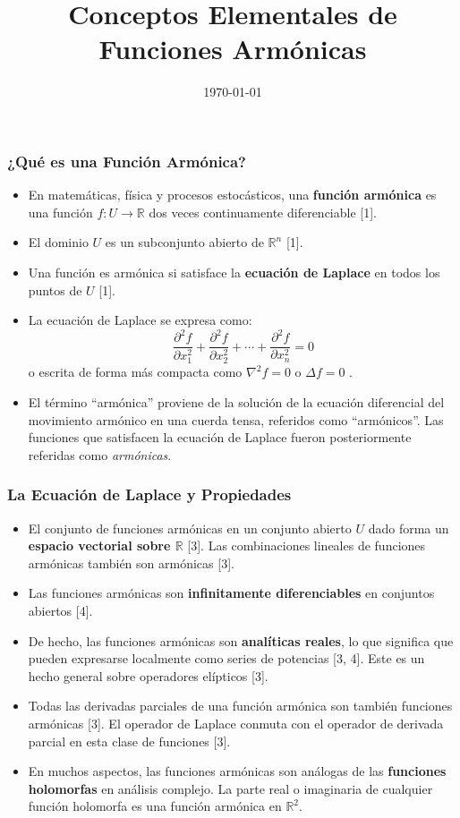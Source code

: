 \documentclass{beamer}
\title{Conceptos Elementales de Funciones Armónicas}
\date{\today} %
\begin{document}
\begin{frame}
  \titlepage
\end{frame}

\begin{frame}
  \frametitle{¿Qué es una Función Armónica?}

  \begin{itemize}
    \item En matemáticas, física y procesos estocásticos, una \textbf{función armónica} es una función $f : U \to \mathbb{R}$ dos veces continuamente diferenciable [1].
    \item El dominio $U$ es un subconjunto abierto de $\mathbb{R}^n$ [1].
    \item Una función es armónica si satisface la \textbf{ecuación de Laplace} en todos los puntos de $U$ [1].
    \item La ecuación de Laplace se expresa como:
      \[ \frac{\partial^2 f}{\partial x_1^2} + \frac{\partial^2 f}{\partial x_2^2} + \cdots + \frac{\partial^2 f}{\partial x_n^2} = 0 \]
      o escrita de forma más compacta como $\nabla^2 f = 0$ o $\Delta f = 0$ .
  \item El término ``armónica'' proviene de la solución de la ecuación diferencial del movimiento armónico en una cuerda tensa, referidos como ``armónicos''. Las funciones que satisfacen la ecuación de Laplace fueron posteriormente referidas como \emph{armónicas}.
  \end{itemize}
\end{frame}

\begin{frame}
  \frametitle{La Ecuación de Laplace y Propiedades}

  \begin{itemize}
          \small
    \item El conjunto de funciones armónicas en un conjunto abierto $U$ dado forma un \textbf{espacio vectorial sobre $\mathbb{R}$} [3]. Las combinaciones lineales de funciones armónicas también son armónicas [3].
    \item Las funciones armónicas son \textbf{infinitamente diferenciables} en conjuntos abiertos [4].
    \item De hecho, las funciones armónicas son \textbf{analíticas reales}, lo que significa que pueden expresarse localmente como series de potencias [3, 4]. Este es un hecho general sobre operadores elípticos [3].
    \item Todas las derivadas parciales de una función armónica son también funciones armónicas [3]. El operador de Laplace conmuta con el operador de derivada parcial en esta clase de funciones [3].
    \item En muchos aspectos, las funciones armónicas son análogas de las \textbf{funciones holomorfas} en análisis complejo. La parte real o imaginaria de cualquier función holomorfa es una función armónica en $\mathbb{R}^2$.
  \end{itemize}
  \end{frame}
\end{document}
